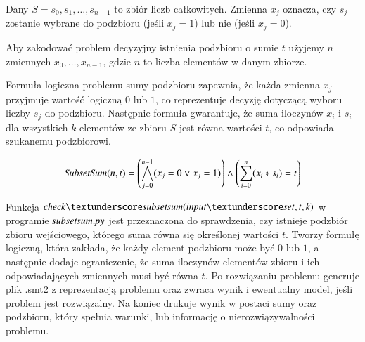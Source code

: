 Dany $S = {s_0, s_1, \ldots, s_{n-1}}$ to zbiór liczb całkowitych. Zmienna $x_j$ oznacza, czy $s_j$ zostanie wybrane do podzbioru (jeśli $x_j = 1$) lub nie (jeśli $x_j = 0$).

Aby zakodować problem decyzyjny istnienia podzbioru o sumie $t$ użyjemy $n$ zmiennych $x_0,\ldots,x_{n-1}$, gdzie $n$ to liczba elementów w danym zbiorze.

Formuła logiczna problemu sumy podzbioru zapewnia, że każda zmienna $x_j$ przyjmuje wartość logiczną $0$ lub $1$, co reprezentuje decyzję dotyczącą wyboru liczby $s_j$ do podzbioru. Następnie formuła gwarantuje, że suma iloczynów $x_i$ i $s_i$ dla wszystkich \(k\) elementów ze zbioru $S$ jest równa wartości $t$, co odpowiada szukanemu podzbiorowi.

\begin{align*}
	{\mathit{SubsetSum}}(n, t) = \left( \bigwedge_{j=0}^{n-1} (x_j = 0 \lor x_j = 1) \right) \land 
	\left( \sum_{i=0}^{n} (x_i * s_i) = t \right)
\end{align*}

Funkcja $\checksubsetsum$ w programie ${\mathit{subsetsum.py}}$ jest przeznaczona do sprawdzenia, czy istnieje podzbiór zbioru wejściowego, którego suma równa się określonej wartości $t$. Tworzy formułę logiczną, która zakłada, że każdy element podzbioru może być $0$ lub $1$, a następnie dodaje ograniczenie, że suma iloczynów elementów zbioru i ich odpowiadających zmiennych musi być równa $t$. Po rozwiązaniu problemu generuje plik .smt2 z reprezentacją problemu oraz zwraca wynik i ewentualny model, jeśli problem jest rozwiązalny. Na koniec drukuje wynik w postaci sumy oraz podzbioru, który spełnia warunki, lub informację o nierozwiązywalności problemu.




